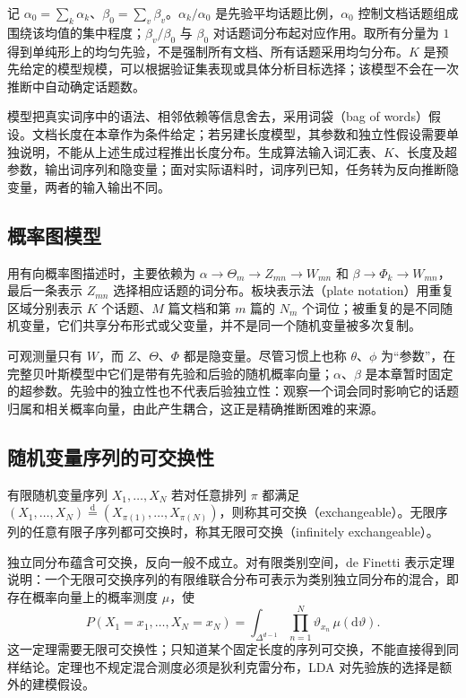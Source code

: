 记 $\alpha_0=\sum_k\alpha_k$、$\beta_0=\sum_v\beta_v$。$\alpha_k/\alpha_0$ 是先验平均话题比例，$\alpha_0$ 控制文档话题组成围绕该均值的集中程度；$\beta_v/\beta_0$ 与 $\beta_0$ 对话题词分布起对应作用。取所有分量为 $1$ 得到单纯形上的均匀先验，不是强制所有文档、所有话题采用均匀分布。$K$ 是预先给定的模型规模，可以根据验证集表现或具体分析目标选择；该模型不会在一次推断中自动确定话题数。

模型把真实词序中的语法、相邻依赖等信息舍去，采用词袋（bag of words）假设。文档长度在本章作为条件给定；若另建长度模型，其参数和独立性假设需要单独说明，不能从上述生成过程推出长度分布。生成算法输入词汇表、$K$、长度及超参数，输出词序列和隐变量；面对实际语料时，词序列已知，任务转为反向推断隐变量，两者的输入输出不同。

\subsection{概率图模型}
\label{subsec:lh-lda-graphical-model}

用有向概率图描述时，主要依赖为 $\alpha\to\Theta_m\to Z_{mn}\to W_{mn}$ 和 $\beta\to\Phi_k\to W_{mn}$，最后一条表示 $Z_{mn}$ 选择相应话题的词分布。板块表示法（plate notation）用重复区域分别表示 $K$ 个话题、$M$ 篇文档和第 $m$ 篇的 $N_m$ 个词位；被重复的是不同随机变量，它们共享分布形式或父变量，并不是同一个随机变量被多次复制。

可观测量只有 $W$，而 $Z$、$\Theta$、$\Phi$ 都是隐变量。尽管习惯上也称 $\theta$、$\phi$ 为“参数”，在完整贝叶斯模型中它们是带有先验和后验的随机概率向量；$\alpha$、$\beta$ 是本章暂时固定的超参数。先验中的独立性也不代表后验独立性：观察一个词会同时影响它的话题归属和相关概率向量，由此产生耦合，这正是精确推断困难的来源。

\subsection{随机变量序列的可交换性}
\label{subsec:lh-lda-exchangeability}

\begin{definition}[可交换序列]
\label{def:lh-lda-exchangeability}
有限随机变量序列 $X_1,\ldots,X_N$ 若对任意排列 $\pi$ 都满足 $(X_1,\ldots,X_N)\overset{\mathrm d}=(X_{\pi(1)},\ldots,X_{\pi(N)})$，则称其可交换（exchangeable）。无限序列的任意有限子序列都可交换时，称其无限可交换（infinitely exchangeable）。
\end{definition}

独立同分布蕴含可交换，反向一般不成立。对有限类别空间，de Finetti 表示定理说明：一个无限可交换序列的有限维联合分布可表示为类别独立同分布的混合，即存在概率向量上的概率测度 $\mu$，使
\begin{equation}
P(X_1=x_1,\ldots,X_N=x_N)
=\int_{\Delta^{d-1}}\prod_{n=1}^N\vartheta_{x_n}\,\mu(\mathrm d\vartheta).
\label{eq:lh-lda-definetti}
\end{equation}
这一定理需要无限可交换性；只知道某个固定长度的序列可交换，不能直接得到同样结论。定理也不规定混合测度必须是狄利克雷分布，LDA 对先验族的选择是额外的建模假设。

